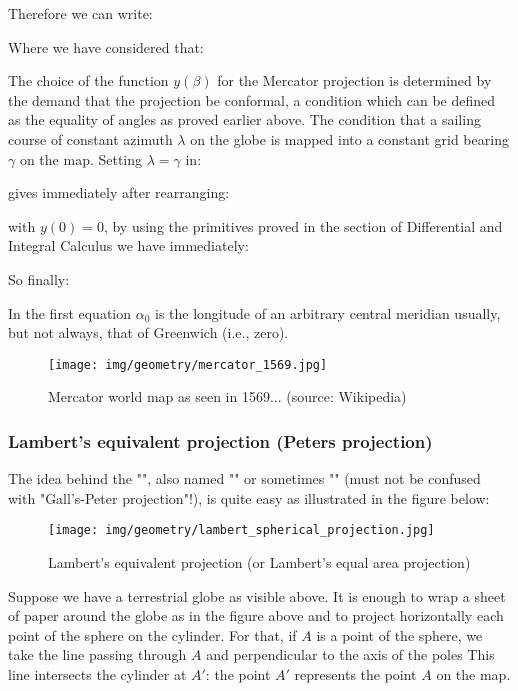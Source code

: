 	Therefore we can write:
	
	Where we have considered that:
	
	The choice of the function $y(\beta)$ for the Mercator projection is determined by the demand that the projection be conformal, a condition which can be defined as the equality of angles as proved earlier above. The condition that a sailing course of constant azimuth $\lambda$ on the globe is mapped into a constant grid bearing $\gamma$ on the map. Setting $\lambda = \gamma$ in:
	
 	gives immediately after rearranging:
	
	with $y(0) = 0$, by using the primitives proved in the section of Differential and Integral Calculus we have immediately:
	
	So finally:
	
	In the first equation $\alpha_0$ is the longitude of an arbitrary central meridian usually, but not always, that of Greenwich (i.e., zero).
	
	\begin{figure}[H]
		\centering
		\texttt{[image: img/geometry/mercator\_1569.jpg]}
		\caption[Mercator world map as seen in 1569]{Mercator world map as seen in 1569... (source: Wikipedia)}
	\end{figure}
	
	\subsubsection{Lambert's equivalent projection (Peters projection)}
	The idea behind the "", also named "" or sometimes "" (must not be confused with "Gall's-Peter projection"!), is quite easy as illustrated in the figure below:
	\begin{figure}[H]
		\centering
		\texttt{[image: img/geometry/lambert\_spherical\_projection.jpg]}
		\caption{Lambert's equivalent projection (or Lambert's equal area projection)}
	\end{figure}
	Suppose we have a terrestrial globe as visible above. It is enough to wrap a sheet of paper around the globe as in the figure above and to project horizontally each point of the sphere on the cylinder. For that, if $A$ is a point of the sphere, we take the line passing through $A$ and perpendicular to the axis of the poles This line intersects the cylinder at $A'$: the point $A'$ represents the point $A$ on the map.
	
